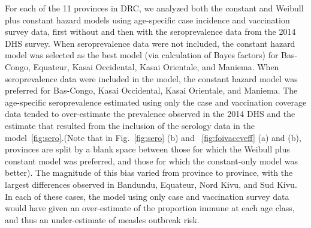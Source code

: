 \documentclass[nofootinbib,aps,pre,twocolumn,superscriptaddress,showkeys,showpacs]{revtex4-1}
\begin{document}
For each of the 11 provinces in DRC, we analyzed both the constant and Weibull plus constant hazard models using age-specific case incidence and vaccination survey data, first without and then with the seroprevalence data from the 2014 DHS survey. When seroprevalence data were not included, the constant hazard model was selected as the best model (via calculation of Bayes factors) for Bas-Congo, Equateur, Kasai Occidental, Kasai Orientale, and Maniema.  When seroprevalence data were included in the model, the constant hazard model was preferred for Bas-Congo, Kasai Occidental, Kasai Orientale, and Maniema.  The age-specific seroprevalence estimated using only the case and vaccination coverage data tended to over-estimate the prevalence observed in the 2014 DHS and the estimate that resulted from the inclusion of the serology data in the model~\ref{fig:sero}.(Note that in Fig.~\ref{fig:sero} (b) and ~\ref{fig:foivaccveff} (a) and (b), provinces are split by a blank space between those for which the Weibull plus constant model was preferred, and those for which the constant-only model was better). The magnitude of this bias varied from province to province, with the largest differences observed in Bandundu, Equateur, Nord Kivu, and Sud Kivu. In each of these cases, the model using only case and vaccination survey data would have given an over-estimate of the proportion immune at each age class, and thus an under-estimate of measles outbreak risk. 
\end{document}
